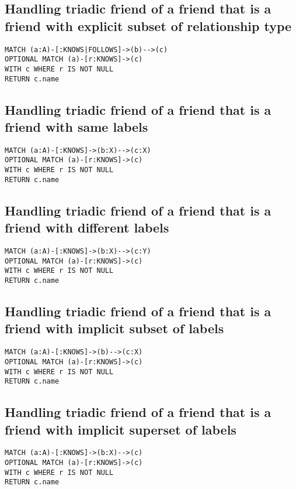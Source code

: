 \subsection{Handling triadic friend of a friend that is a friend with explicit subset of relationship type}

\begin{lstlisting}
MATCH (a:A)-[:KNOWS|FOLLOWS]->(b)-->(c)
OPTIONAL MATCH (a)-[r:KNOWS]->(c)
WITH c WHERE r IS NOT NULL
RETURN c.name
\end{lstlisting}

\subsection{Handling triadic friend of a friend that is a friend with same labels}

\begin{lstlisting}
MATCH (a:A)-[:KNOWS]->(b:X)-->(c:X)
OPTIONAL MATCH (a)-[r:KNOWS]->(c)
WITH c WHERE r IS NOT NULL
RETURN c.name
\end{lstlisting}

\subsection{Handling triadic friend of a friend that is a friend with different labels}

\begin{lstlisting}
MATCH (a:A)-[:KNOWS]->(b:X)-->(c:Y)
OPTIONAL MATCH (a)-[r:KNOWS]->(c)
WITH c WHERE r IS NOT NULL
RETURN c.name
\end{lstlisting}

\subsection{Handling triadic friend of a friend that is a friend with implicit subset of labels}

\begin{lstlisting}
MATCH (a:A)-[:KNOWS]->(b)-->(c:X)
OPTIONAL MATCH (a)-[r:KNOWS]->(c)
WITH c WHERE r IS NOT NULL
RETURN c.name
\end{lstlisting}

\subsection{Handling triadic friend of a friend that is a friend with implicit superset of labels}

\begin{lstlisting}
MATCH (a:A)-[:KNOWS]->(b:X)-->(c)
OPTIONAL MATCH (a)-[r:KNOWS]->(c)
WITH c WHERE r IS NOT NULL
RETURN c.name
\end{lstlisting}

